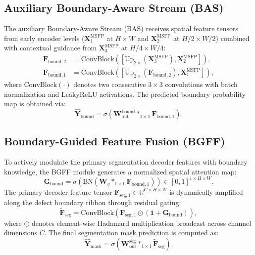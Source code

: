 \documentclass{ieeeaccess}
\begin{document}
\subsection{Auxiliary Boundary-Aware Stream (BAS)}
The auxiliary Boundary-Aware Stream (BAS) receives spatial feature tensors from early encoder levels ($\mathbf{X}_1^{\text{MSFP}}$ at $H \times W$ and $\mathbf{X}_2^{\text{MSFP}}$ at $H/2 \times W/2$) combined with contextual guidance from $\mathbf{X}_3^{\text{MSFP}}$ at $H/4 \times W/4$:
\begin{align}
  \mathbf{F}_{\text{bound}, 2} &= \text{ConvBlock}\left(\left[\text{Up}_{2\times}(\mathbf{X}_3^{\text{MSFP}}), \mathbf{X}_2^{\text{MSFP}}\right]\right), \label{eq:bas_f2} \\
  \mathbf{F}_{\text{bound}, 1} &= \text{ConvBlock}\left(\left[\text{Up}_{2\times}(\mathbf{F}_{\text{bound}, 2}), \mathbf{X}_1^{\text{MSFP}}\right]\right), \label{eq:bas_f1}
\end{align}
where $\text{ConvBlock}(\cdot)$ denotes two consecutive $3 \times 3$ convolutions with batch normalization and LeakyReLU activations. The predicted boundary probability map is obtained via:
\begin{equation}
  \hat{\mathbf{Y}}_{\text{bound}} = \sigma\left(\mathbf{W}_{\text{out}}^{\text{bound}} *_{1\times 1} \mathbf{F}_{\text{bound}, 1}\right).
  \label{eq:bas_pred}
\end{equation}

\subsection{Boundary-Guided Feature Fusion (BGFF)}
To actively modulate the primary segmentation decoder features with boundary knowledge, the BGFF module generates a normalized spatial attention map:
\begin{equation}
  \mathbf{G}_{\text{bound}} = \sigma\left(\text{BN}\left(\mathbf{W}_g *_{1\times 1} \mathbf{F}_{\text{bound}, 1}\right)\right) \in [0, 1]^{1 \times H \times W}.
  \label{eq:bgff_gate}
\end{equation}
The primary decoder feature tensor $\mathbf{F}_{\text{seg}, 1} \in \mathbb{R}^{C \times H \times W}$ is dynamically amplified along the defect boundary ribbon through residual gating:
\begin{equation}
  \tilde{\mathbf{F}}_{\text{seg}} = \text{ConvBlock}\left(\mathbf{F}_{\text{seg}, 1} \odot (\mathbf{1} + \mathbf{G}_{\text{bound}})\right),
  \label{eq:bgff_mod}
\end{equation}
where $\odot$ denotes element-wise Hadamard multiplication broadcast across channel dimensions $C$. The final segmentation mask prediction is computed as:
\begin{equation}
  \hat{\mathbf{Y}}_{\text{mask}} = \sigma\left(\mathbf{W}_{\text{out}}^{\text{seg}} *_{1\times 1} \tilde{\mathbf{F}}_{\text{seg}}\right).
  \label{eq:seg_pred}
\end{equation}
\end{document}
